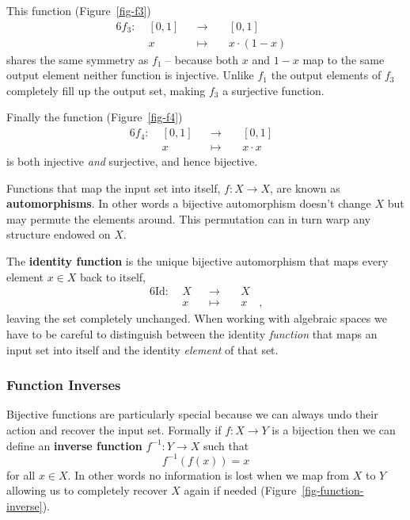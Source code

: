 \documentclass[
  letterpaper,
  DIV=11,
  numbers=noendperiod]{scrartcl}
\begin{document}
This function (Figure~\ref{fig-f3}) \begin{alignat*}{6}
f_3 :\; & [0, 1] & &\rightarrow& \; & [0, 1] &
\\
& x & &\mapsto& & x \cdot (1 - x) &
\end{alignat*} shares the same symmetry as \(f_1\) -- because both \(x\)
and \(1 - x\) map to the same output element neither function is
injective. Unlike \(f_1\) the output elements of \(f_3\) completely fill
up the output set, making \(f_3\) a surjective function.

Finally the function (Figure~\ref{fig-f4}) \begin{alignat*}{6}
f_4 :\; & [0, 1] & &\rightarrow& \; & [0, 1] &
\\
& x & &\mapsto& & x \cdot x &
\end{alignat*} is both injective \emph{and} surjective, and hence
bijective.

Functions that map the input set into itself, \(f : X \rightarrow X\),
are known as \textbf{automorphisms}. In other words a bijective
automorphism doesn't change \(X\) but may permute the elements around.
This permutation can in turn warp any structure endowed on \(X\).

The \textbf{identity function} is the unique bijective automorphism that
maps every element \(x \in X\) back to itself, \begin{alignat*}{6}
\text{Id} :\; & X & &\rightarrow& \; & X &
\\
& x & &\mapsto& & x &,
\end{alignat*} leaving the set completely unchanged. When working with
algebraic spaces we have to be careful to distinguish between the
identity \emph{function} that maps an input set into itself and the
identity \emph{element} of that set.

\hypertarget{function-inverses}{%
\subsubsection{Function Inverses}\label{function-inverses}}

Bijective functions are particularly special because we can always undo
their action and recover the input set. Formally if
\(f : X \rightarrow Y\) is a bijection then we can define an
\textbf{inverse function} \(f^{-1} : Y \rightarrow X\) such that \[
f^{-1}(f(x)) = x
\] for all \(x \in X\). In other words no information is lost when we
map from \(X\) to \(Y\) allowing us to completely recover \(X\) again if
needed (Figure~\ref{fig-function-inverse}).
\end{document}
